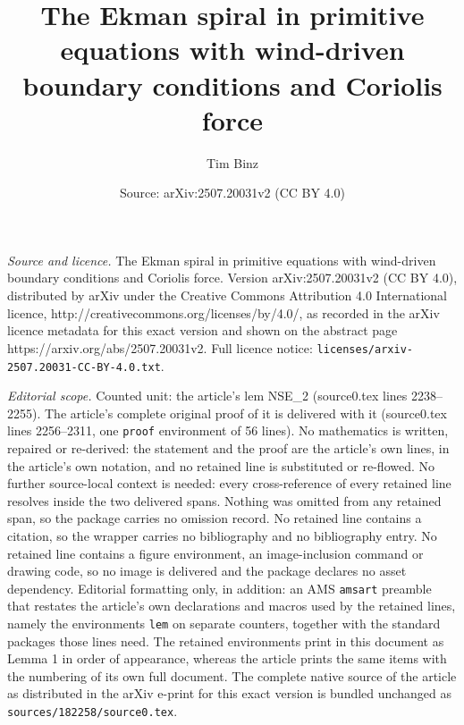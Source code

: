 \documentclass[10pt,a4paper]{amsart}
\title{The Ekman spiral in primitive equations with wind-driven boundary conditions and Coriolis force}
\author{Tim Binz}
\date{Source: arXiv:2507.20031v2 (CC BY 4.0)}
\begin{document}
\maketitle

\noindent\emph{Source and licence.} The Ekman spiral in primitive equations with wind-driven boundary conditions and Coriolis force. Version arXiv:2507.20031v2 (CC BY 4.0), distributed by arXiv under the Creative Commons Attribution 4.0 International licence, http://creativecommons.org/licenses/by/4.0/, as recorded in the arXiv licence metadata for this exact version and shown on the abstract page https://arxiv.org/abs/2507.20031v2. Full licence notice: \texttt{licenses/arxiv-2507.20031-CC-BY-4.0.txt}.\par\smallskip

\noindent\textit{Editorial scope.} Counted unit: the article's lem NSE\_2 (source0.tex lines 2238--2255). The article's complete original proof of it is delivered with it (source0.tex lines 2256--2311, one \texttt{proof} environment of 56 lines). No mathematics is written, repaired or re-derived: the statement and the proof are the article's own lines, in the article's own notation, and no retained line is substituted or re-flowed.  No further source-local context is needed: every cross-reference of every retained line resolves inside the two delivered spans.  Nothing was omitted from any retained span, so the package carries no omission record.  No retained line contains a citation, so the wrapper carries no bibliography and no bibliography entry.  No retained line contains a figure environment, an image-inclusion command or drawing code, so no image is delivered and the package declares no asset dependency.  Editorial formatting only, in addition: an AMS \texttt{amsart} preamble that restates the article's own declarations and macros used by the retained lines, namely the environments \texttt{lem} on separate counters, together with the standard packages those lines need.  The retained environments print in this document as Lemma 1 in order of appearance, whereas the article prints the same items with the numbering of its own full document.  The complete native source of the article as distributed in the arXiv e-print for this exact version is bundled unchanged as \texttt{sources/182258/source0.tex}.
\end{document}
